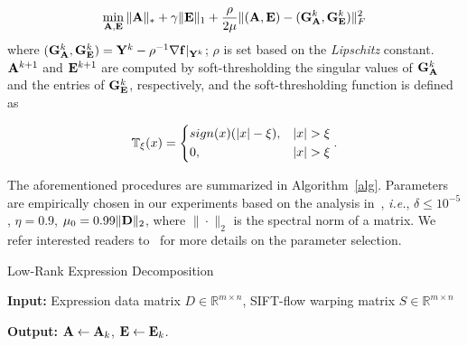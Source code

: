 \documentclass[journal]{IEEEtran}
\begin{document}
\begin{equation} \label{eq:apg_fast}
\min_{\A,\E} \|\A\|_* + \gamma \|\E\|_1 + \frac{\rho}{2\mu}\|(\A,\E)-(\G^k_\A,\G^k_\E)\|^2_F
\end{equation}
where $({\bf G}^k_{\bf A},{\bf G}^k_{\bf E})={\bf Y}^k-\rho^{-1}\nabla {\bf f}|_{{\bf Y}^k}$; $\rho$ is set based on the \textit{Lipschitz} constant. ${\bf A}^{k+1}$ and ${\bf E}^{k+1}$ are computed by soft-thresholding the singular values of ${\bf G}^k_{\bf A}$ and the entries of ${\bf G}^k_{\bf E}$, respectively, and the soft-thresholding function is defined as

\begin{equation}
\mathbb{T}_\xi(x)=
	\begin{dcases}
    sign(x)(|x|-\xi),  	& |x|>\xi \\
    0,  								& |x|>\xi
	\end{dcases}.
\end{equation}

The aforementioned procedures are summarized in Algorithm~\ref{alg}. Parameters are empirically chosen in our experiments based on the analysis in~\cite{Lin09}, \textit{i.e.}, $\delta\leq10^{-5}$, $\eta=0.9$, $\mu_0=0.99\|{\bf D}\|_2$, where $\|\cdot\|_2$ is the spectral norm of a matrix. We refer interested readers to~\cite{Lin09} for more details on the parameter selection. 

\begin{algorithm}[htb]
    \caption{Low-Rank Expression Decomposition}
    \textbf{Input:} Expression data matrix $D\in \mathbb{R}^{m\times n}$, SIFT-flow warping matrix $S\in \mathbb{R}^{m\times n}$\\
    \begin{algorithmic}[1]
			\State{$\D^*=\D+\S$}
				
				
				
			\EndWhile
    \end{algorithmic}
    \textbf{Output:} ${\bf A}\leftarrow {\bf A}_k$, ${\bf E}\leftarrow {\bf E}_k$. \\
    \label{alg}
\end{algorithm}
\end{document}
